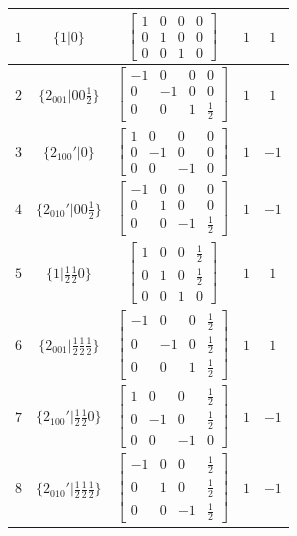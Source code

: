 \documentclass[fleqn,8pt]{jsarticle}
\begin{document}
\begin{longtable}{ccccc}
$ 1 $ & $ \{1|0\} $ & $ \begin{bmatrix} 1 & 0 & 0 & 0 \\ 0 & 1 & 0 & 0 \\ 0 & 0 & 1 & 0 \end{bmatrix} $ & $ 1 $ & $ 1 $ \\ \hline
$ 2 $ & $ \{2{}_{001}|0 0 \frac{1}{2}\} $ & $ \begin{bmatrix} -1 & 0 & 0 & 0 \\ 0 & -1 & 0 & 0 \\ 0 & 0 & 1 & \frac{1}{2} \end{bmatrix} $ & $ 1 $ & $ 1 $ \\ \hline
$ 3 $ & $ \{2{}_{100}{}'|0\} $ & $ \begin{bmatrix} 1 & 0 & 0 & 0 \\ 0 & -1 & 0 & 0 \\ 0 & 0 & -1 & 0 \end{bmatrix} $ & $ 1 $ & $ -1 $ \\ \hline
$ 4 $ & $ \{2{}_{010}{}'|0 0 \frac{1}{2}\} $ & $ \begin{bmatrix} -1 & 0 & 0 & 0 \\ 0 & 1 & 0 & 0 \\ 0 & 0 & -1 & \frac{1}{2} \end{bmatrix} $ & $ 1 $ & $ -1 $ \\ \hline
$ 5 $ & $ \{1|\frac{1}{2} \frac{1}{2} 0\} $ & $ \begin{bmatrix} 1 & 0 & 0 & \frac{1}{2} \\ 0 & 1 & 0 & \frac{1}{2} \\ 0 & 0 & 1 & 0 \end{bmatrix} $ & $ 1 $ & $ 1 $ \\ \hline
$ 6 $ & $ \{2{}_{001}|\frac{1}{2} \frac{1}{2} \frac{1}{2}\} $ & $ \begin{bmatrix} -1 & 0 & 0 & \frac{1}{2} \\ 0 & -1 & 0 & \frac{1}{2} \\ 0 & 0 & 1 & \frac{1}{2} \end{bmatrix} $ & $ 1 $ & $ 1 $ \\ \hline
$ 7 $ & $ \{2{}_{100}{}'|\frac{1}{2} \frac{1}{2} 0\} $ & $ \begin{bmatrix} 1 & 0 & 0 & \frac{1}{2} \\ 0 & -1 & 0 & \frac{1}{2} \\ 0 & 0 & -1 & 0 \end{bmatrix} $ & $ 1 $ & $ -1 $ \\ \hline
$ 8 $ & $ \{2{}_{010}{}'|\frac{1}{2} \frac{1}{2} \frac{1}{2}\} $ & $ \begin{bmatrix} -1 & 0 & 0 & \frac{1}{2} \\ 0 & 1 & 0 & \frac{1}{2} \\ 0 & 0 & -1 & \frac{1}{2} \end{bmatrix} $ & $ 1 $ & $ -1 $ \\
\end{longtable}
\end{document}
